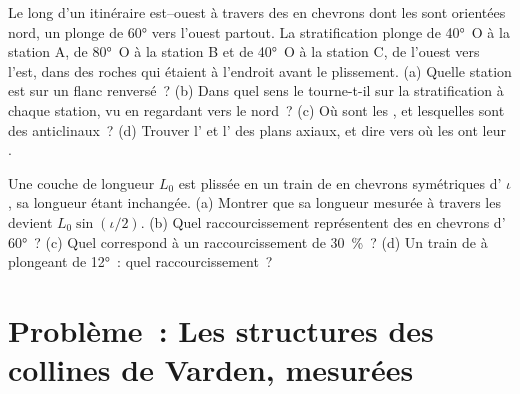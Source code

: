 \begin{exercise}[$\star\star\star$]\label{exo:b1:faults-folds-fabrics:11}
Le long d'un itinéraire est--ouest à travers des  en chevrons dont les  sont orientées nord,
un  plonge de \ang{60} vers l'ouest partout. La stratification
plonge de \ang{40}~O à la station A, de \ang{80}~O à la station B et de \ang{40}~O à
la station C, de l'ouest vers l'est, dans des roches qui étaient à l'endroit avant
le plissement. (a) Quelle station est sur un flanc renversé~? (b) Dans quel sens
le  tourne-t-il sur la stratification à chaque station, vu en regardant vers le nord~?
(c) Où sont les , et lesquelles sont des anticlinaux~? (d) Trouver l'
et l' des plans axiaux, et dire vers où les 
ont leur .
\end{exercise}

\begin{exercise}[$\star\star\star$]\label{exo:b1:faults-folds-fabrics:12}
Une couche de longueur $L_0$ est plissée en un train de  en chevrons symétriques
d' $\iota$, sa longueur étant inchangée. (a) Montrer que sa longueur
mesurée à travers les  devient $L_0\sin(\iota/2)$. (b) Quel raccourcissement
représentent des  en chevrons d' \ang{60}~? (c) Quel 
correspond à un raccourcissement de \qty{30}{\percent}~? (d) Un train de 
à  plongeant de \ang{12}~: quel raccourcissement~?
\end{exercise}

\section{Problème~: Les structures des collines de Varden, mesurées}

